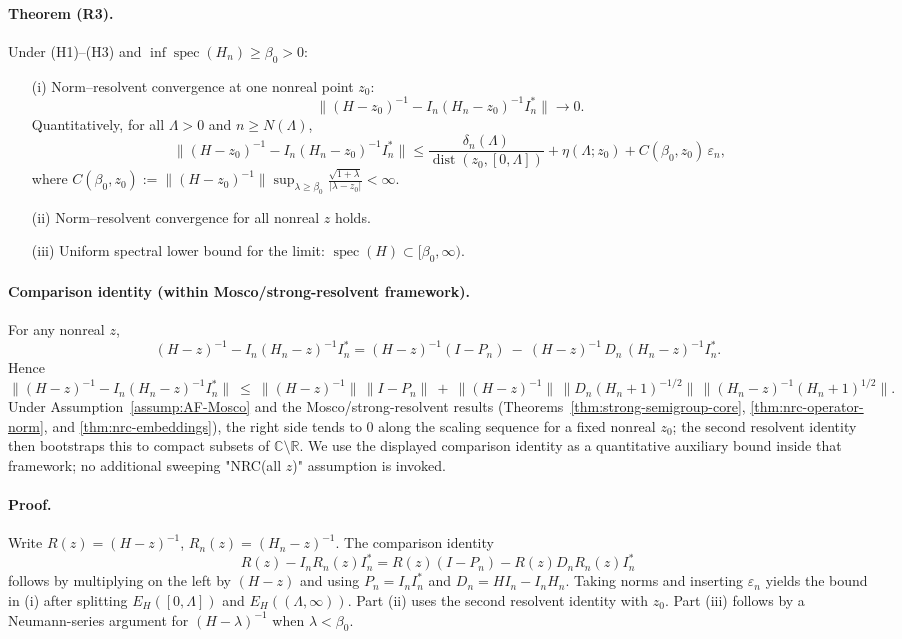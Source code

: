 \documentclass[11pt]{amsart}
\theoremstyle{plain}
\theoremstyle{definition}
\theoremstyle{remark}
\begin{document}
\paragraph{Theorem (R3).}
Under (H1)–(H3) and $\inf\operatorname{spec}(H_n)\ge \beta_0>0$:
\begin{itemize}
  \item[(i)] Norm–resolvent convergence at one nonreal point $z_0$:
  \[
    \bigl\|(H-z_0)^{-1} - I_n(H_n-z_0)^{-1} I_n^*\bigr\|\to 0.
  \]
  Quantitatively, for all $\Lambda>0$ and $n\ge N(\Lambda)$,
  \[
    \bigl\|(H-z_0)^{-1} - I_n(H_n-z_0)^{-1} I_n^*\bigr\|\le \frac{\delta_n(\Lambda)}{\operatorname{dist}(z_0,[0,\Lambda])}+\eta(\Lambda;z_0)+C(\beta_0,z_0)\,\varepsilon_n,
  \]
  where $C(\beta_0,z_0):=\bigl\|(H-z_0)^{-1}\bigr\|\sup_{\lambda\ge\beta_0} \frac{\sqrt{1+\lambda}}{|\lambda-z_0|}<\infty$.
  \item[(ii)] Norm–resolvent convergence for all nonreal $z$ holds.
  \item[(iii)] Uniform spectral lower bound for the limit: $\operatorname{spec}(H)\subset[\beta_0,\infty)$.
\end{itemize}

\paragraph{Comparison identity (within Mosco/strong-resolvent framework).}
For any nonreal $z$,
\[
  (H-z)^{-1} - I_n(H_n-z)^{-1} I_n^*= (H-z)^{-1}(I-P_n)\ -\ (H-z)^{-1}\, D_n\,(H_n-z)^{-1} I_n^*.
\]
Hence
\[
  \big\|(H-z)^{-1} - I_n(H_n-z)^{-1} I_n^*\big\|\ \le\ \|(H-z)^{-1}\|\,\|I-P_n\|\ +\ \|(H-z)^{-1}\|\,\|D_n(H_n+1)^{-1/2}\|\,\|(H_n-z)^{-1}(H_n+1)^{1/2}\|.
\]
Under Assumption~\ref{assump:AF-Mosco} and the Mosco/strong-resolvent results (Theorems~\ref{thm:strong-semigroup-core}, \ref{thm:nrc-operator-norm}, and \ref{thm:nrc-embeddings}), the right side tends to $0$ along the scaling sequence for a fixed nonreal $z_0$; the second resolvent identity then bootstraps this to compact subsets of $\mathbb C\setminus\mathbb R$. We use the displayed comparison identity as a quantitative auxiliary bound inside that framework; no additional sweeping "NRC(all $z$)" assumption is invoked.

\paragraph{Proof.}
Write $R(z)=(H-z)^{-1}$, $R_n(z)=(H_n-z)^{-1}$. The comparison identity
\[
  R(z)-I_n R_n(z) I_n^*= R(z)(I-P_n) - R(z) D_n R_n(z) I_n^*
\]
follows by multiplying on the left by $(H-z)$ and using $P_n=I_n I_n^*$ and $D_n=H I_n-I_n H_n$. Taking norms and inserting $\varepsilon_n$ yields the bound in (i) after splitting $E_H([0,\Lambda])$ and $E_H((\Lambda,\infty))$. Part (ii) uses the second resolvent identity with $z_0$. Part (iii) follows by a Neumann-series argument for $(H-\lambda)^{-1}$ when $\lambda<\beta_0$.
\end{document}
